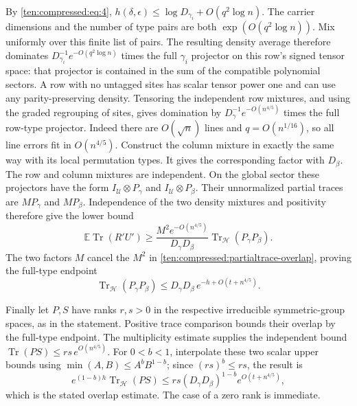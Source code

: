 By \eqref{ten:compressed:eq:4},
$h(\delta,\epsilon)\le\log D_{\gamma_i}+O(q^2\log n)$.
The carrier dimensions and the number of type pairs are both
$\exp(O(q^2\log n))$. Mix uniformly over this finite list of pairs. The resulting density average therefore dominates
$D_{\gamma_i}^{-1}e^{-O(q^2\log n)}$ times the full $\gamma_i$ projector on this row's signed tensor space: that projector is contained in the sum of the compatible polynomial sectors. A row with no untagged sites has scalar tensor power one and can use any parity-preserving density. Tensoring the independent row mixtures, and using the graded regrouping of sites, gives domination by
$D_\gamma^{-1}e^{-O(n^{4/5})}$ times the full row-type projector. Indeed there are $O(\sqrt n)$ lines and $q=O(n^{1/16})$, so all line errors fit in $O(n^{4/5})$. Construct the column mixture in exactly the same way with its local permutation types. It gives the corresponding factor with $D_\beta$. The row and column mixtures are independent. On the global sector these projectors have the form $I_{\mathcal U}\otimes P_\gamma$ and $I_{\mathcal U}\otimes P_\beta$. Their unnormalized partial traces are $M P_\gamma$ and $M P_\beta$. Independence of the two density mixtures and positivity therefore give the lower bound
\[
 \mathbb E\operatorname{Tr}(R'U')
 \ge \frac{M^2e^{-O(n^{4/5})}}{D_\gamma D_\beta}
                  \operatorname{Tr}_{\mathcal H}(P_\gamma P_\beta).
\]
The two factors $M$ cancel the $M^2$ in
\eqref{ten:compressed:partialtrace-overlap}, proving the full-type endpoint
\[
 \operatorname{Tr}_{\mathcal H}(P_\gamma P_\beta)
 \le D_\gamma D_\beta\,e^{-h+O(t+n^{4/5})}.
\]

Finally let $P,S$ have ranks $r,s>0$ in the respective irreducible symmetric-group spaces, as in the statement. Positive trace comparison bounds their overlap by the full-type endpoint. The multiplicity estimate supplies the independent bound
$\operatorname{Tr}(PS)\le rs\,e^{O(n^{4/5})}$.
For $0<b<1$, interpolate these two scalar upper bounds using
$\min(A,B)\le A^bB^{1-b}$; since $(rs)^b\le rs$, the result is
\[
 e^{(1-b)h}\operatorname{Tr}_{\mathcal H}(PS)
 \le rs(D_\gamma D_\beta)^{1-b}e^{O(t+n^{4/5})},
\]
which is the stated overlap estimate. The case of a zero rank is immediate.


